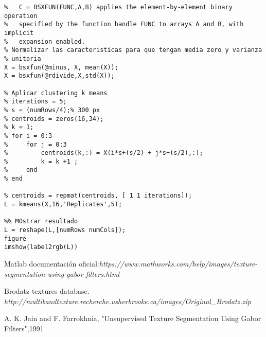 \documentclass[es,gi]{ifirak}\usepackage[]{graphicx}\usepackage[]{color}
\begin{document}
\begin{lstlisting}
%   C = BSXFUN(FUNC,A,B) applies the element-by-element binary operation
%   specified by the function handle FUNC to arrays A and B, with implicit
%   expansion enabled.
% Normalizar las caracteristicas para que tengan media zero y varianza
% unitaria
X = bsxfun(@minus, X, mean(X));
X = bsxfun(@rdivide,X,std(X));

% Aplicar clustering k means
% iterations = 5;
% s = (numRows/4);% 300 px
% centroids = zeros(16,34);
% k = 1;
% for i = 0:3
%     for j = 0:3
%         centroids(k,:) = X(i*s+(s/2) + j*s+(s/2),:);
%         k = k +1 ;
%     end
% end

% centroids = repmat(centroids, [ 1 1 iterations]);
L = kmeans(X,16,'Replicates',5);
 
%% MOstrar resultado
L = reshape(L,[numRows numCols]);
figure
imshow(label2rgb(L))

\end{lstlisting}
\begin{thebibliography}{arauak}
	
	 Matlab documentación oficial:\textit{https://www.mathworks.com/help/images/texture-segmentation-using-gabor-filters.html}
	
	 Brodatz textures database. \textit{http://multibandtexture.recherche.usherbrooke.ca/images/Original\_Brodatz.zip}

	 A. K. Jain and F. Farrokhnia, "Unsupervised Texture Segmentation Using Gabor Filters",1991
	
\end{thebibliography}
\end{document}
